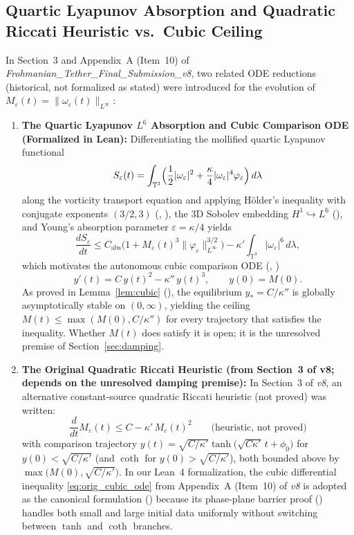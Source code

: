 \documentclass[11pt,a4paper]{article}
\theoremstyle{plain}
\theoremstyle{definition}
\theoremstyle{remark}
\newcommand{\T}{\mathbb{T}^3}
\begin{document}
\subsection{Quartic Lyapunov Absorption and Quadratic Riccati Heuristic vs.\ Cubic Ceiling}
In Section~3 and Appendix~A (Item~10) of \emph{Frohmanian\_Tether\_Final\_Submission\_v8}, two related ODE reductions (historical, not formalized as stated) were introduced for the evolution of $M_\varepsilon(t)=\|\omega_\varepsilon(t)\|_{L^\infty}$:
\begin{enumerate}
\item \textbf{The Quartic Lyapunov $L^6$ Absorption and Cubic Comparison ODE (Formalized in Lean):}
Differentiating the mollified quartic Lyapunov functional
\[
S_\varepsilon(t)=\int_{\T}\Bigl(\frac12|\omega_\varepsilon|^2+\frac{\kappa}{4}|\omega_\varepsilon|^4\varphi_\varepsilon\Bigr)\,d\lambda
\]
along the vorticity transport equation and applying Hölder's inequality with conjugate exponents $(3/2,3)$ (, ), the 3D Sobolev embedding $H^1\hookrightarrow L^6$ (), and Young's absorption parameter $\varepsilon=\kappa/4$ yields
\begin{equation}\label{eq:orig_dS}
\frac{dS_\varepsilon}{dt}\le C_{\mathrm{abs}}\bigl(1+M_\varepsilon(t)^3\|\varphi_\varepsilon\|_{L^\infty}^{3/2}\bigr)-\kappa'\int_{\T}|\omega_\varepsilon|^6\,d\lambda,
\end{equation}
which motivates the autonomous cubic comparison ODE (, )
\begin{equation}\label{eq:orig_cubic_ode}
y'(t) = C\,y(t)^2 - \kappa''\,y(t)^3,\qquad y(0)=M(0).
\end{equation}
As proved in Lemma~\ref{lem:cubic} (), the equilibrium $y_*=C/\kappa''$ is globally asymptotically stable on $(0,\infty)$, yielding the ceiling $M(t)\le\max(M(0),C/\kappa'')$ for every trajectory that satisfies the inequality. Whether $M(t)$ does satisfy it is open; it is the unresolved premise of Section~\ref{sec:damping}.
\item \textbf{The Original Quadratic Riccati Heuristic (from Section~3 of v8; depends on the unresolved damping premise):}
In Section~3 of \emph{v8}, an alternative constant-source quadratic Riccati heuristic (not proved) was written:
\begin{equation}\label{eq:orig_quad_riccati}
\frac{d}{dt}M_\varepsilon(t) \le C - \kappa'\,M_\varepsilon(t)^2\qquad\text{(heuristic, not proved)}
\end{equation}
with comparison trajectory $y(t)=\sqrt{C/\kappa'}\tanh\bigl(\sqrt{C\kappa'}\,t+\phi_0\bigr)$ for $y(0)<\sqrt{C/\kappa'}$ (and $\coth$ for $y(0)>\sqrt{C/\kappa'}$), both bounded above by $\max\bigl(M(0),\sqrt{C/\kappa'}\bigr)$. In our Lean~4 formalization, the cubic differential inequality \eqref{eq:orig_cubic_ode} from Appendix~A (Item~10) of \emph{v8} is adopted as the canonical formulation () because its phase-plane barrier proof () handles both small and large initial data uniformly without switching between $\tanh$ and $\coth$ branches.
\end{enumerate}
\end{document}
